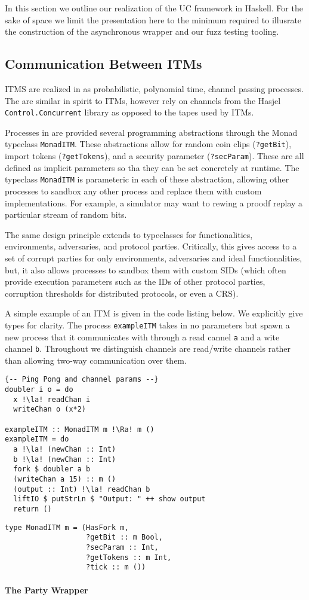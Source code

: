 In this section we outline our realization of the UC framework in Haskell.
For the sake of space we limit the presentation here to the minimum required to illusrate the construction of the asynchronous wrapper and our fuzz testing tooling. 

\subsection{Communication Between ITMs}
ITMS are realized in \us as probabilistic, polynomial time, channel passing processes. 
The are similar in spirit to ITMs, however rely on channels from the Hasjel \texttt{Control.Concurrent} library as opposed to the tapes used by ITMs. 

Processes in \us are provided several programming abstractions through the Monad typeclass \texttt{MonadITM}. 
These abstractions allow for random coin clips (\texttt{?getBit}), import tokens (\texttt{?getTokens}), and a security parameter (\texttt{?secParam}).
These are all defined as implicit parameters so tha they can be set concretely at runtime. 
The typeclass \texttt{MonadITM} is parameteric in each of these abstraction, allowing other processes to sandbox any other process and replace them with custom implementations.
For example, a simulator may want to rewing a proodf replay a particular stream of random bits.

The same design principle extends to typeclasses for functionalities, environments, adversaries, and protocol parties. 
Critically, this gives access to a set of corrupt parties for only environments, adversaries and ideal functionalities, but, it also allows processes to sandbox them with custom SIDs (which often provide execution parameters such as the IDs of other protocol parties, corruption thresholds for distributed protocols, or even a CRS).


A simple example of an ITM is given in the code listing below. We explicitly give types for clarity.
The process \texttt{exampleITM} takes in no parameters but spawn a new process that it communicates with through a read cannel \texttt{a} and a wite channel \texttt{b}.
Throughout \us we distinguish channels are read/write channels rather than allowing two-way communication over them. 

\begin{lstlisting}
{-- Ping Pong and channel params --}
doubler i o = do
  x !\la! readChan i
  writeChan o (x*2)

exampleITM :: MonadITM m !\Ra! m ()
exampleITM = do
  a !\la! (newChan :: Int)
  b !\la! (newChan :: Int)
  fork $ doubler a b
  (writeChan a 15) :: m ()
  (output :: Int) !\la! readChan b
  liftIO $ putStrLn $ "Output: " ++ show output
  return ()
\end{lstlisting}

\begin{lstlisting}
type MonadITM m = (HasFork m,
                   ?getBit :: m Bool,
                   ?secParam :: Int,
                   ?getTokens :: m Int,
                   ?tick :: m ())
\end{lstlisting}

\paragraph{The Party Wrapper}
